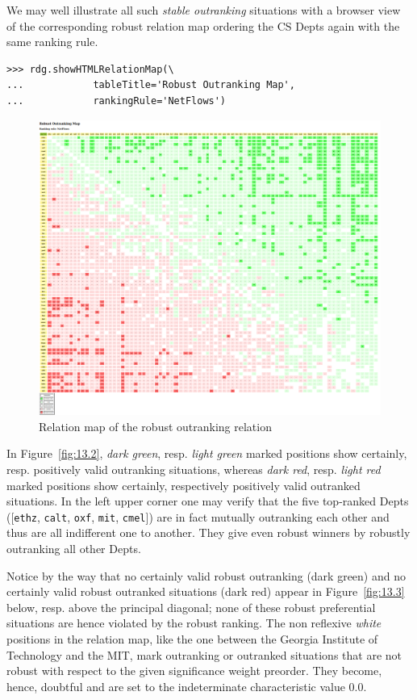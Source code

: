 We may well illustrate all such \emph{stable outranking} situations with a browser view of the corresponding robust relation map ordering the CS Depts again with the same \NetFlows ranking rule.
\begin{lstlisting}
>>> rdg.showHTMLRelationMap(\
...            tableTitle='Robust Outranking Map',
...            rankingRule='NetFlows')
\end{lstlisting}
\begin{figure}[ht]
\includegraphics[width=\hsize]{Figures/13-2-the_cs_RelationMap.png}
\caption{Relation map of the robust outranking relation}
\label{fig:13.2}       %
\end{figure}

In Figure~\vref{fig:13.2}, \emph{dark green}, resp. \emph{light green} marked positions show certainly, resp. positively valid outranking situations, whereas \emph{dark red}, resp. \emph{light red} marked positions show certainly, respectively positively valid outranked situations. In the left upper corner one may verify that the five top-ranked Depts ([\texttt{ethz}, \texttt{calt}, \texttt{oxf}, \texttt{mit}, \texttt{cmel}]) are in fact mutually outranking each other and thus are all indifferent one to another. They give even robust \Condorcet winners by robustly outranking all other Depts.

Notice by the way that no certainly valid robust outranking (dark green) and no certainly valid robust outranked situations (dark red) appear in Figure~\vref{fig:13.3} below, resp. above the principal diagonal; none of these robust preferential situations are hence violated by the robust \NetFlows ranking. The non reflexive \emph{white} positions in the relation map, like the one between the Georgia Institute of Technology and the MIT, mark outranking or outranked situations that are not robust with respect to the given significance weight preorder. They become, hence, doubtful and are set to the indeterminate characteristic value $0.0$.

